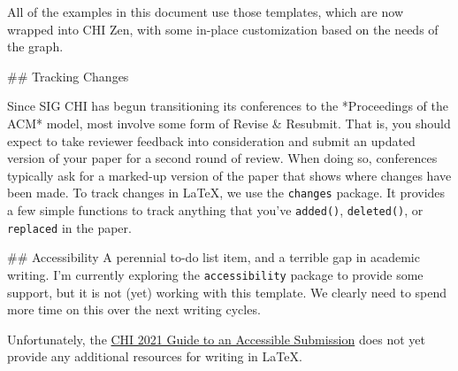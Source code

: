 \begin{markdown}
All of the examples in this document use those templates, which are now wrapped into CHI Zen, with some in-place customization based on the needs of the graph. 



## Tracking Changes

Since SIG CHI has begun transitioning its conferences to the *Proceedings of the ACM* model, most involve some form of Revise \& Resubmit. That is, you should expect to take reviewer feedback into consideration and submit an updated version of your paper for a second round of review. When doing so, conferences typically ask for a marked-up version of the paper that shows where changes have been made.  To track changes in \LaTeX, we use the \texttt{changes} package. It provides a few simple functions to track anything that you've \texttt{added()}, \texttt{deleted()}, or \texttt{replaced} in the paper. 



## Accessibility
A perennial to-do list item, and a terrible gap in academic writing. I'm currently exploring the \texttt{accessibility} package to provide some support, but it is not (yet) working with this template. We clearly need to spend more time on this over the next writing cycles.

Unfortunately, the \href{https://chi2021.acm.org/for-authors/presenting/papers/guide-to-an-accessible-submission}{CHI 2021 Guide to an Accessible Submission} does not yet provide any additional resources for writing in \LaTeX. 


\end{markdown}